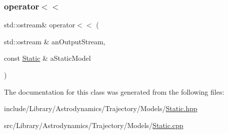 \subsubsection{\texorpdfstring{operator$<$$<$}{operator<<}}
{\footnotesize\ttfamily std\+::ostream\& operator$<$$<$ (\begin{DoxyParamCaption}\item[{std\+::ostream \&}]{an\+Output\+Stream,  }\item[{const \hyperlink{classlibrary_1_1astro_1_1trajectory_1_1models_1_1_static}{Static} \&}]{a\+Static\+Model }\end{DoxyParamCaption})\hspace{0.3cm}{\ttfamily [friend]}}



The documentation for this class was generated from the following files\+:\begin{DoxyCompactItemize}
\item 
include/\+Library/\+Astrodynamics/\+Trajectory/\+Models/\hyperlink{_static_8hpp}{Static.\+hpp}\item 
src/\+Library/\+Astrodynamics/\+Trajectory/\+Models/\hyperlink{_static_8cpp}{Static.\+cpp}\end{DoxyCompactItemize}
